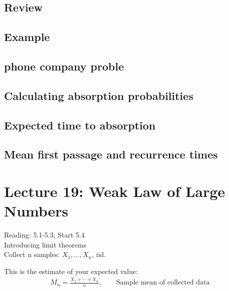 \documentclass{article}
\begin{document}
\subsection{Review}


\subsection{Example}


\subsection{phone company proble}


\subsection{Calculating absorption probabilities}


\subsection{Expected time to absorption}

\subsection{Mean first passage and recurrence times}



\section{Lecture 19: Weak Law of Large Numbers}

Reading: 5.1-5.3, Start 5.4
\\
Introducing limit theorems\\

Collect n samples:  $X_1,\ldots, X_n$, iid.

This is the estimate of your expected value:
\begin{align*}
    M_n = \frac{X_1 +\cdots + X_n}{n}, \qquad \text{Sample mean of collected data}
\end{align*}
\end{document}
